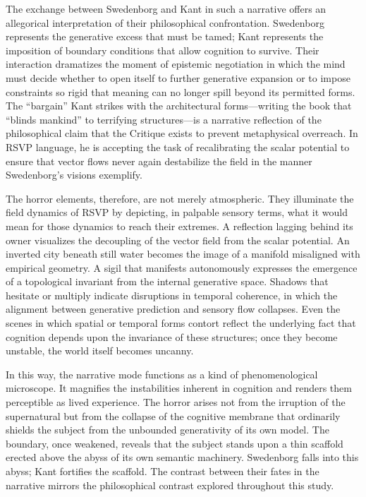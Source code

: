 \documentclass[12pt]{article}
\begin{document}
The exchange between Swedenborg and Kant in such a narrative offers an 
allegorical interpretation of their philosophical confrontation. Swedenborg 
represents the generative excess that must be tamed; Kant represents the 
imposition of boundary conditions that allow cognition to survive. Their 
interaction dramatizes the moment of epistemic negotiation in which the mind 
must decide whether to open itself to further generative expansion or to impose 
constraints so rigid that meaning can no longer spill beyond its permitted 
forms. The “bargain” Kant strikes with the architectural forms—writing the book 
that “blinds mankind” to terrifying structures—is a narrative reflection of the 
philosophical claim that the Critique exists to prevent metaphysical 
overreach. In RSVP language, he is accepting the task of recalibrating the 
scalar potential to ensure that vector flows never again destabilize the field 
in the manner Swedenborg’s visions exemplify.

The horror elements, therefore, are not merely atmospheric. They illuminate the 
field dynamics of RSVP by depicting, in palpable sensory terms, what it would 
mean for those dynamics to reach their extremes. A reflection lagging behind its 
owner visualizes the decoupling of the vector field from the scalar potential.  
An inverted city beneath still water becomes the image of a manifold misaligned 
with empirical geometry. A sigil that manifests autonomously expresses the 
emergence of a topological invariant from the internal generative space.  
Shadows that hesitate or multiply indicate disruptions in temporal coherence, in 
which the alignment between generative prediction and sensory flow collapses.  
Even the scenes in which spatial or temporal forms contort reflect the 
underlying fact that cognition depends upon the invariance of these structures; 
once they become unstable, the world itself becomes uncanny.

In this way, the narrative mode functions as a kind of phenomenological 
microscope. It magnifies the instabilities inherent in cognition and renders 
them perceptible as lived experience. The horror arises not from the irruption 
of the supernatural but from the collapse of the cognitive membrane that 
ordinarily shields the subject from the unbounded generativity of its own 
model. The boundary, once weakened, reveals that the subject stands upon a thin 
scaffold erected above the abyss of its own semantic machinery. Swedenborg 
falls into this abyss; Kant fortifies the scaffold. The contrast between their 
fates in the narrative mirrors the philosophical contrast explored throughout 
this study.
\end{document}
